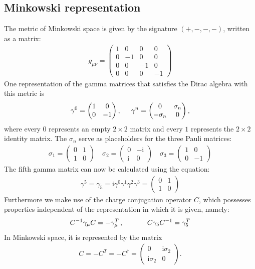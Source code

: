 \documentclass[oneside, openany]{book}
\numberwithin{equation}{chapter}
\numberwithin{figure}{chapter}
\newcommand{\ii}{\mathrm{i}}
\newcommand{\g}[0]{\gamma}
\begin{document}
\subsection{Minkowski representation}
The metric of Minkowski space is given by the signature $(+, -, -, -)$, written as a matrix:
\begin{align}
	g_{\mu\nu} =
	\begin{pmatrix}
		1 & 0 & 0 & 0 \\
		0 & -1 & 0 & 0 \\
		0 & 0 & -1 & 0 \\
		0 & 0 & 0 & -1
	\end{pmatrix}
\end{align}
One representation of the gamma matrices that satisfies the Dirac algebra with this metric is
\begin{align}
	\g^0 = 
	\begin{pmatrix}
		1 & 0 \\
		0 & -1
	\end{pmatrix},\hspace{0.5cm}
	\g^n = 
	\begin{pmatrix}
		0 & \sigma_n \\
		-\sigma_n & 0
	\end{pmatrix},
\end{align}
where every $0$ represents an empty $2\times2$ matrix and every $1$ represents the $2\times2$ identity matrix. The $\sigma_n$ serve as placeholders for the three Pauli matrices:
\begin{align}
	\sigma_1 =
	\begin{pmatrix}
		0 & 1\\
		1 & 0
	\end{pmatrix}
	\quad
	\sigma_2 =
	\begin{pmatrix}
		0 & -\ii \\
		\ii & 0
	\end{pmatrix}
	\quad
	\sigma_3 =
	\begin{pmatrix}
		1 & 0\\
		0 & -1
	\end{pmatrix}
\end{align}
The fifth gamma matrix can now be calculated using the equation:
\begin{align}
	\g^5 = \g_5 = \ii \g^0 \g^1 \g^2 \g^3 = 
	\begin{pmatrix}
		0 & 1 \\
		1 & 0
	\end{pmatrix}
\end{align}
Furthermore we make use of the charge conjugation operator $C$, which possesses properties independent of the representation in which it is given, namely:
\begin{align}
	C^{-1} \g_\mu C = -\g_\mu^T \,,\hspace{1.2cm} C\g_5 C^{-1} = \g_5^T
\end{align}
In Minkowski space, it is represented by the matrix
\begin{align}
	C = -C^T = -C^\dagger =
	\begin{pmatrix}
		0 & \ii \sigma_2 \\
		\ii \sigma_2 & 0
	\end{pmatrix}.
\end{align}
\end{document}
